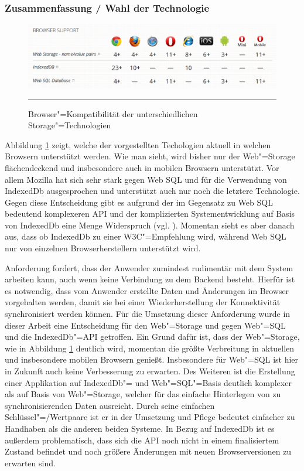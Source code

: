\subsubsection*{Zusammenfassung / Wahl der Technologie}
\begin{figure}[ht]
  \centering
  \includegraphics[width=\textwidth,height=\textheight,keepaspectratio]{./Figures/storage_browser_compatibility.pdf}
    \rule{35em}{0.5pt}
  \caption[Storage Browser Kompatibilität]{Browser"=Kompatibilität der unterschiedlichen Storage"=Technologien}
  \label{fig:storage_browser_compatibility}
\end{figure}
Abbildung \ref{fig:storage_browser_compatibility} zeigt, welche der vorgestellten Techologien aktuell in welchen Browsern unterstützt werden. Wie man sieht, wird bisher nur der Web"=Storage flächendeckend und insbesondere auch in mobilen Browsern unterstützt. Vor allem Mozilla hat sich sehr stark gegen Web \ac{SQL} und für die Verwendung von IndexedDb ausgesprochen und unterstützt auch nur noch die letztere Technologie. Gegen diese Entscheidung gibt es aufgrund der im Gegensatz zu Web \ac{SQL} bedeutend komplexeren \ac{API} und der komplizierten Systementwicklung auf Basis von IndexedDb eine Menge Widerspruch (vgl. \cite{Ranganathan2010}). Momentan sieht es aber danach aus, dass ob IndexedDb zu einer \ac{W3C}"=Empfehlung wird, während Web \ac{SQL} nur von einzelnen Browserherstellern unterstützt wird.

Anforderung  fordert, dass der Anwender zumindest rudimentär mit dem System arbeiten kann, auch wenn keine Verbindung zu dem Backend besteht. Hierfür ist es notwendig, dass vom Anwender erstellte Daten und Änderungen im Browser vorgehalten werden, damit sie bei einer Wiederherstellung der Konnektivität synchronisiert werden können. Für die Umsetzung dieser Anforderung wurde in dieser Arbeit eine Entscheidung für den Web"=Storage und gegen Web"=\ac{SQL} und die IndexedDb"=\ac{API} getroffen. Ein Grund dafür ist, dass der Web"=Storage, wie in Abbildung \ref{fig:storage_browser_compatibility} deutlich wird, momentan die größte Verbreitung in aktuellen und insbesondere mobilen Browsern genießt. Insbesondere für Web"=\ac{SQL} ist hier in Zukunft auch keine Verbesserung zu erwarten. Des Weiteren ist die Erstellung einer Applikation auf IndexedDb"= und Web"=\ac{SQL}"=Basis deutlich komplexer als auf Basis von Web"=Storage, welcher für das einfache Hinterlegen von zu synchronisierenden Daten ausreicht. Durch seine einfachen Schlüssel"=/Wertpaare ist er in der Umsetzung und Pflege bedeutet einfacher zu Handhaben als die anderen beiden Systeme. In Bezug auf IndexedDb ist es außerdem problematisch, dass sich die \ac{API} noch nicht in einem finalisiertem Zustand befindet und noch größere Änderungen mit neuen Browserversionen zu erwarten sind.

